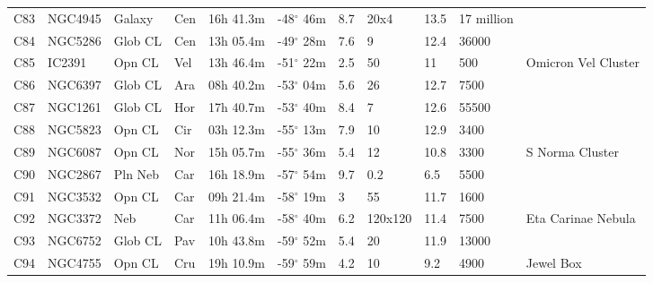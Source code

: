 \begin{longtable}{@{}lllllllllll@{}}
C83        & NGC4945     & Galaxy     & Cen       & 16h 41.3m & -48$^{\circ}$ 46m  & 8.7       & 20x4                 & 13.5     & 17 million          &                                 \\
C84        & NGC5286     & Glob CL    & Cen       & 13h 05.4m & -49$^{\circ}$ 28m  & 7.6       & 9                    & 12.4     & 36000               &                                 \\
C85        & IC2391      & Opn CL     & Vel       & 13h 46.4m & -51$^{\circ}$ 22m  & 2.5       & 50                   & 11       & 500                 & Omicron Vel Cluster             \\
C86        & NGC6397     & Glob CL    & Ara       & 08h 40.2m & -53$^{\circ}$ 04m  & 5.6       & 26                   & 12.7     & 7500                &                                 \\
C87        & NGC1261     & Glob CL    & Hor       & 17h 40.7m & -53$^{\circ}$ 40m  & 8.4       & 7                    & 12.6     & 55500               &                                 \\
C88        & NGC5823     & Opn CL     & Cir       & 03h 12.3m & -55$^{\circ}$ 13m  & 7.9       & 10                   & 12.9     & 3400                &                                 \\
C89        & NGC6087     & Opn CL     & Nor       & 15h 05.7m & -55$^{\circ}$ 36m  & 5.4       & 12                   & 10.8     & 3300                & S Norma Cluster                 \\
C90        & NGC2867     & Pln Neb    & Car       & 16h 18.9m & -57$^{\circ}$ 54m  & 9.7       & 0.2                  & 6.5      & 5500                &                                 \\
C91        & NGC3532     & Opn CL     & Car       & 09h 21.4m & -58$^{\circ}$ 19m  & 3         & 55                   & 11.7     & 1600                &                                 \\
C92        & NGC3372     & Neb        & Car       & 11h 06.4m & -58$^{\circ}$ 40m  & 6.2       & 120x120              & 11.4     & 7500                & Eta Carinae Nebula              \\
C93        & NGC6752     & Glob CL    & Pav       & 10h 43.8m & -59$^{\circ}$ 52m  & 5.4       & 20                   & 11.9     & 13000               &                                 \\
C94        & NGC4755     & Opn CL     & Cru       & 19h 10.9m & -59$^{\circ}$ 59m  & 4.2       & 10                   & 9.2      & 4900                & Jewel Box                       \\

\end{longtable}
